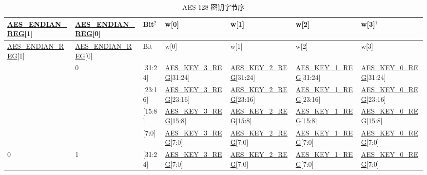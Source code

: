 \documentclass[main\_\_CN.tex]{subfiles}
\begin{document}
\begin{landscape}

\begin{tiny}
\begin{longtable}[c]
{ |p{2cm}|p{2cm}|p{1cm}|p{2.5cm}|p{2.5cm}|p{2.5cm}|p{2.5cm}|}
\caption{AES-128 密钥字节序}\label{table:AES128KeyEndian}\\
\hline
\rowcolor{lightgray}
\hyperref[regdesc:AESENDIANREG]{AES\_ENDIAN\_REG}[1]	&	\hyperref[regdesc:AESENDIANREG]{AES\_ENDIAN\_REG}[0]	&	Bit$^2$	&	w[0]	&	w[1]	&	w[2] 	&	w[3]$^1$	\\\hline
\endfirsthead
\hline
\rowcolor{lightgray}
\hyperref[regdesc:AESENDIANREG]{AES\_ENDIAN\_REG}[1]	&	\hyperref[regdesc:AESENDIANREG]{AES\_ENDIAN\_REG}[0]	&	Bit	&	w[0]	&	w[1]	&	w[2] 	&	w[3]	\\\hline
\endhead
\endfoot
\multirow{4}{4cm}{0} 	&	\multirow{4}{4cm}{0}	&	[31:24] 	&	\hyperref[regdesc:AESKEYnREG]{AES\_KEY\_3\_REG}[31:24]	&	\hyperref[regdesc:AESKEYnREG]{AES\_KEY\_2\_REG}[31:24]	& \hyperref[regdesc:AESKEYnREG]{AES\_KEY\_1\_REG}[31:24]	&	\hyperref[regdesc:AESKEYnREG]{AES\_KEY\_0\_REG}[31:24]\\
\cline{3-7}
&&	[23:16] 	&	\hyperref[regdesc:AESKEYnREG]{AES\_KEY\_3\_REG}[23:16]	&	\hyperref[regdesc:AESKEYnREG]{AES\_KEY\_2\_REG}[23:16] 	&	\hyperref[regdesc:AESKEYnREG]{AES\_KEY\_1\_REG}[23:16]	&	\hyperref[regdesc:AESKEYnREG]{AES\_KEY\_0\_REG}[23:16]\\
\cline{3-7}
&&	[15:8]	&	\hyperref[regdesc:AESKEYnREG]{AES\_KEY\_3\_REG}[15:8]	&	\hyperref[regdesc:AESKEYnREG]{AES\_KEY\_2\_REG}[15:8] 	&	\hyperref[regdesc:AESKEYnREG]{AES\_KEY\_1\_REG}[15:8]	&	\hyperref[regdesc:AESKEYnREG]{AES\_KEY\_0\_REG}[15:8]\\
\cline{3-7}
&&	[7:0]	&	\hyperref[regdesc:AESKEYnREG]{AES\_KEY\_3\_REG}[7:0]	&	\hyperref[regdesc:AESKEYnREG]{AES\_KEY\_2\_REG}[7:0] 	&	\hyperref[regdesc:AESKEYnREG]{AES\_KEY\_1\_REG}[7:0]	&	\hyperref[regdesc:AESKEYnREG]{AES\_KEY\_0\_REG}[7:0]\\
\hline
\multirow{4}{4cm}{0} 	&	\multirow{4}{4cm}{1}	&	[31:24] 	&	\hyperref[regdesc:AESKEYnREG]{AES\_KEY\_3\_REG}[7:0]	&	\hyperref[regdesc:AESKEYnREG]{AES\_KEY\_2\_REG}[7:0] 	&	\hyperref[regdesc:AESKEYnREG]{AES\_KEY\_1\_REG}[7:0]	&	\hyperref[regdesc:AESKEYnREG]{AES\_KEY\_0\_REG}[7:0]\\
\cline{3-7}

\end{longtable}
\end{tiny}
\end{landscape}
\end{document}
